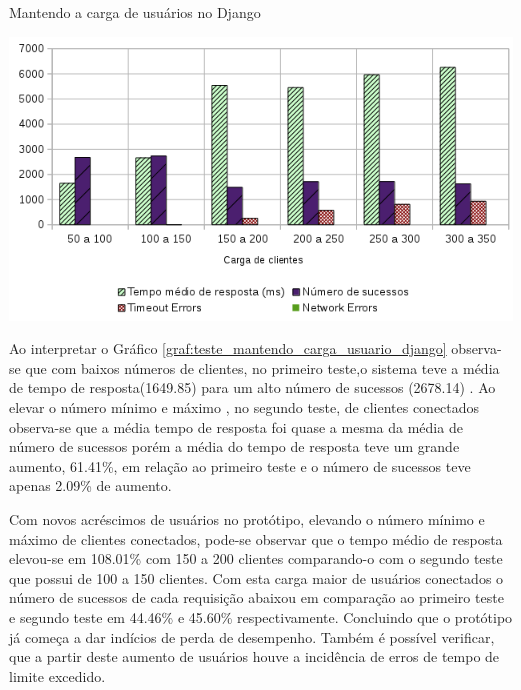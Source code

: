   \begin{grafico}[H]
    \setlength{\abovecaptionskip}{5pt}
    \setlength{\belowcaptionskip}{0pt}

    \caption[Mantendo a carga de usuários no Django]
	    {Mantendo a carga de usuários no Django}
    \centering
    \includegraphics[width=.80\textwidth]{imagem/graficos/grafico_django_plano_de_teste_3.png}
    \captionsetup[grafico]{justification=centering}
    \label{graf:teste_mantendo_carga_usuario_django}
  \end{grafico}

  Ao interpretar o Gráfico \ref{graf:teste_mantendo_carga_usuario_django}  observa-se que com baixos números de clientes, no primeiro
  teste,o sistema teve a média de tempo de resposta(1649.85) para um alto número de sucessos (2678.14) . Ao elevar o número mínimo e máximo
  , no segundo teste, de clientes conectados observa-se que a média tempo de resposta foi quase a mesma da média de número de sucessos porém
  a média do tempo de resposta teve um grande aumento, 61.41\%, em relação ao primeiro teste e o número de sucessos teve apenas
  2.09\% de aumento.

  Com novos acréscimos de usuários no protótipo, elevando o número mínimo e máximo de clientes conectados, pode-se observar que o
  tempo médio de resposta elevou-se em 108.01\% com 150 a 200 clientes comparando-o com o segundo teste que possui de 100 a 150 clientes.
  Com esta carga maior de usuários conectados o número de sucessos de cada requisição abaixou em comparação ao primeiro teste e segundo
  teste em 44.46\% e 45.60\% respectivamente. Concluindo que o protótipo já começa a dar indícios de perda de desempenho. Também é possível
  verificar, que a partir deste aumento de usuários houve a incidência de erros de tempo de limite excedido.


